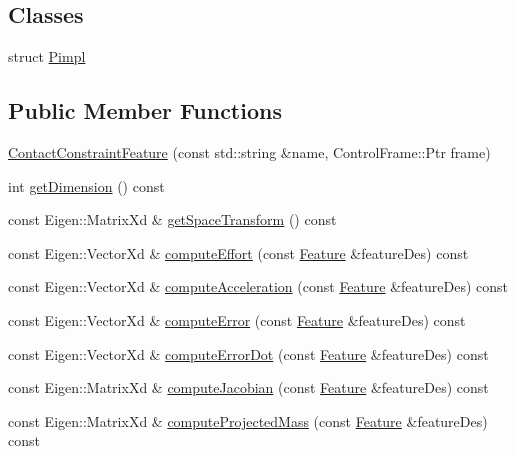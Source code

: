 \subsection*{Classes}
\begin{DoxyCompactItemize}
\item 
struct \hyperlink{structocra_1_1ContactConstraintFeature_1_1Pimpl}{Pimpl}
\end{DoxyCompactItemize}
\subsection*{Public Member Functions}
\begin{DoxyCompactItemize}
\item 
\hyperlink{classocra_1_1ContactConstraintFeature_a2e4c6265bd194309b5e2304260d53bec}{Contact\+Constraint\+Feature} (const std\+::string \&name, Control\+Frame\+::\+Ptr frame)
\item 
int \hyperlink{classocra_1_1ContactConstraintFeature_a37fe34596933ae4754bf7b3f23d2d377}{get\+Dimension} () const 
\item 
const Eigen\+::\+Matrix\+Xd \& \hyperlink{classocra_1_1ContactConstraintFeature_a57a4732ac394be1c95be8fbc6e61dc8e}{get\+Space\+Transform} () const 
\item 
const Eigen\+::\+Vector\+Xd \& \hyperlink{classocra_1_1ContactConstraintFeature_a0ede26f833f022ec461112a134b30d2b}{compute\+Effort} (const \hyperlink{classocra_1_1Feature}{Feature} \&feature\+Des) const 
\item 
const Eigen\+::\+Vector\+Xd \& \hyperlink{classocra_1_1ContactConstraintFeature_a2aee29d54c14a2d84f923635e3dbff01}{compute\+Acceleration} (const \hyperlink{classocra_1_1Feature}{Feature} \&feature\+Des) const 
\item 
const Eigen\+::\+Vector\+Xd \& \hyperlink{classocra_1_1ContactConstraintFeature_a4b411629650b49197ef103d254c1c6f9}{compute\+Error} (const \hyperlink{classocra_1_1Feature}{Feature} \&feature\+Des) const 
\item 
const Eigen\+::\+Vector\+Xd \& \hyperlink{classocra_1_1ContactConstraintFeature_a058539c179c9db2adbb10d886b20e63a}{compute\+Error\+Dot} (const \hyperlink{classocra_1_1Feature}{Feature} \&feature\+Des) const 
\item 
const Eigen\+::\+Matrix\+Xd \& \hyperlink{classocra_1_1ContactConstraintFeature_adf722aecb46bade8b6d8b3fa3ae40946}{compute\+Jacobian} (const \hyperlink{classocra_1_1Feature}{Feature} \&feature\+Des) const 
\item 
const Eigen\+::\+Matrix\+Xd \& \hyperlink{classocra_1_1ContactConstraintFeature_a3dccdc7e43b2eee94c6fec1218ea5604}{compute\+Projected\+Mass} (const \hyperlink{classocra_1_1Feature}{Feature} \&feature\+Des) const 

\end{DoxyCompactItemize}
